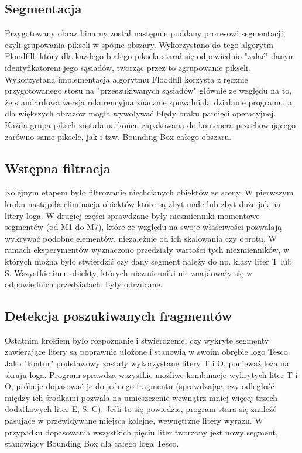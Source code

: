 \documentclass[11pt,a4paper]{article} %
\numberwithin{equation}{section} %
\numberwithin{figure}{section} %
\numberwithin{table}{section} %
\begin{document}
\subsection{Segmentacja}

Przygotowany obraz binarny został następnie poddany procesowi segmentacji, czyli grupowania pikseli w spójne obszary. Wykorzystano do tego algorytm Floodfill, który dla każdego białego piksela starał się odpowiednio "zalać" danym identyfikatorem jego sąsiadów, tworząc przez to zgrupowanie pikseli. Wykorzystana implementacja algorytmu Floodfill korzysta z ręcznie przygotowanego stosu na "przeszukiwanych sąsiadów" głównie ze względu na to, że standardowa wersja rekurencyjna znacznie spowalniała działanie programu, a dla większych obrazów mogła wywoływać błędy braku pamięci operacyjnej. Każda grupa pikseli została na końcu zapakowana do kontenera przechowującego zarówno same piksele, jak i tzw. Bounding Box całego obszaru.

\subsection{Wstępna filtracja}

Kolejnym etapem było filtrowanie niechcianych obiektów ze sceny. W pierwszym kroku nastąpiła eliminacja obiektów które są zbyt małe lub zbyt duże jak na litery loga. W drugiej części sprawdzane były niezmienniki momentowe segmentów (od M1 do M7), które ze względu na swoje właściwości pozwalają wykrywać podobne elementów, niezależnie od ich skalowania czy obrotu. W ramach eksperymentów wyznaczono przedziały wartości tych niezmienników, w których można było stwierdzić czy dany segment należy do np. klasy liter T lub S. Wszystkie inne obiekty, których niezmienniki nie znajdowały się w odpowiednich przedziałach, były odrzucane.

\subsection{Detekcja poszukiwanych fragmentów}

Ostatnim krokiem było rozpoznanie i stwierdzenie, czy wykryte segmenty zawierające litery są poprawnie ułożone i stanowią w swoim obrębie logo Tesco. Jako "kontur" podstawowy zostały wykorzystane litery T i O, ponieważ leżą na skraju loga. Program sprawdza wszystkie możliwe kombinacje wykrytych liter T i O, próbuje dopasować je do jednego fragmentu (sprawdzając, czy odległość między ich środkami pozwala na umieszczenie wewnątrz mniej więcej trzech dodatkowych liter E, S, C). Jeśli to się powiedzie, program stara się znaleźć pasujące w przewidywane miejsca kolejne, wewnętrzne litery wyrazu. W przypadku dopasowania wszystkich pięciu liter tworzony jest nowy segment, stanowiący Bounding Box dla całego loga Tesco.
\end{document}
